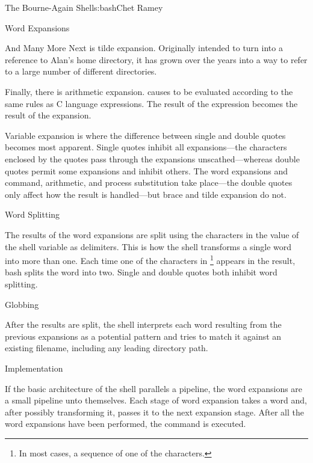 \begin{aosachapter}{The Bourne-Again Shell}{s:bash}{Chet Ramey}
\begin{aosasect1}{Word Expansions}
\begin{aosasect2}{And Many More}
Next is tilde expansion.  Originally intended to turn
 into a
reference to Alan's home directory, it has grown over the years into a
way to refer to a large number of different directories.

Finally, there is arithmetic expansion.  
causes  to be evaluated according to the same rules
as C language expressions.  The result of the expression becomes the
result of the expansion.

Variable expansion is where the difference between single and double
quotes becomes most apparent.  Single quotes inhibit all
expansions---the characters enclosed by the quotes pass through the
expansions unscathed---whereas double quotes permit some expansions
and inhibit others.  The word expansions and command, arithmetic, and
process substitution take place---the double quotes only affect how
the result is handled---but brace and tilde expansion do not.

\end{aosasect2}

\begin{aosasect2}{Word Splitting}

The results of the word expansions are split using the characters in
the value of the shell variable  as delimiters.  This is how
the shell transforms a single word into more than one.  Each time one
of the characters in \footnote{In most cases, a sequence of one
of the characters.} appears in the result, bash splits the word into
two.  Single and double quotes both inhibit word splitting.

\end{aosasect2}

\begin{aosasect2}{Globbing}

After the results are split, the shell interprets each word resulting
from the previous expansions as a potential pattern and tries to match
it against an existing filename, including any leading directory path.

\end{aosasect2}

\begin{aosasect2}{Implementation}

If the basic architecture of the shell parallels a pipeline, the word
expansions are a small pipeline unto themselves.  Each stage of word
expansion takes a word and, after possibly transforming it, passes it
to the next expansion stage.  After all the word expansions have been
performed, the command is executed.


\end{aosasect2}
\end{aosasect1}
\end{aosachapter}
